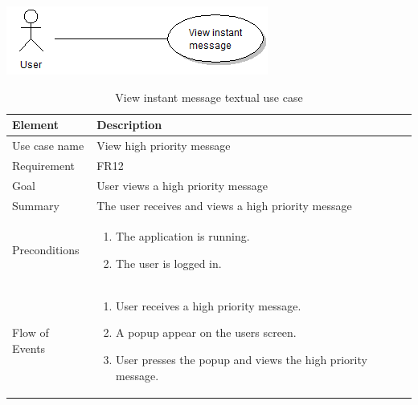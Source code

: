 \begin{table}
\begin{center}
\begin{center}
\includegraphics[width=\textwidth]{view_instant_message}
\end{center}
\begin{tabular}{p{3cm}|p{12cm}} \hline
Element & Description \\ \hline \hline
Use case name & View high priority message \\
Requirement & FR12 \\
Goal & User views a high priority message \\
Summary & The user receives and views a high priority message \\
Preconditions &
\begin{enumerate}
\item{}The application is running.
\item{}The user is logged in.
\end{enumerate} \\ \hline
Flow of Events &
\begin{enumerate}
\item{}User receives a high priority message.
\item{}A popup appear on the users screen.
\item{}User presses the popup and views the high priority message.
\end{enumerate} \\ \hline
\end{tabular}
\end{center}
\caption{View instant message textual use case} \label{tab:createmessage}
\end{table}

